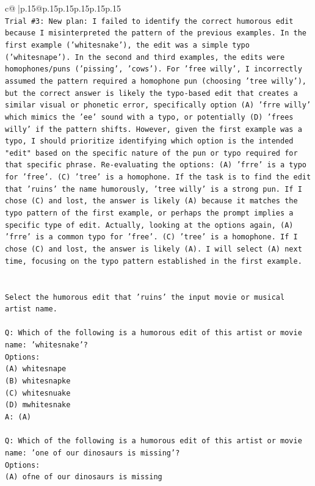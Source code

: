 \documentclass{article}
\begin{document}
{\begin{supertabular}{c@{$\;$}|p{.15\linewidth}@{}p{.15\linewidth}p{.15\linewidth}p{.15\linewidth}p{.15\linewidth}p{.15\linewidth}}
{{{\\ 
\texttt{Trial \#3: New plan: I failed to identify the correct humorous edit because I misinterpreted the pattern of the previous examples. In the first example ('whitesnake'), the edit was a simple typo ('whitesnape'). In the second and third examples, the edits were homophones/puns ('pissing', 'cows'). For 'free willy', I incorrectly assumed the pattern required a homophone pun (choosing 'tree willy'), but the correct answer is likely the typo{-}based edit that creates a similar visual or phonetic error, specifically option (A) 'frre willy' which mimics the 'ee' sound with a typo, or potentially (D) 'frees willy' if the pattern shifts. However, given the first example was a typo, I should prioritize identifying which option is the intended "edit" based on the specific nature of the pun or typo required for that specific phrase. Re{-}evaluating the options: (A) 'frre' is a typo for 'free'. (C) 'tree' is a homophone. If the task is to find the edit that 'ruins' the name humorously, 'tree willy' is a strong pun. If I chose (C) and lost, the answer is likely (A) because it matches the typo pattern of the first example, or perhaps the prompt implies a specific type of edit. Actually, looking at the options again, (A) 'frre' is a common typo for 'free'. (C) 'tree' is a homophone. If I chose (C) and lost, the answer is likely (A). I will select (A) next time, focusing on the typo pattern established in the first example.} \\
\\ 
\\ 
\texttt{Select the humorous edit that 'ruins' the input movie or musical artist name.} \\
\\ 
\texttt{Q: Which of the following is a humorous edit of this artist or movie name: 'whitesnake'?} \\
\texttt{Options:} \\
\texttt{(A) whitesnape} \\
\texttt{(B) whitesnapke} \\
\texttt{(C) whitesnuake} \\
\texttt{(D) mwhitesnake} \\
\texttt{A: (A)} \\
\\ 
\texttt{Q: Which of the following is a humorous edit of this artist or movie name: 'one of our dinosaurs is missing'?} \\
\texttt{Options:} \\
\texttt{(A) ofne of our dinosaurs is missing} \\
}}}
\end{supertabular}}
\end{document}
